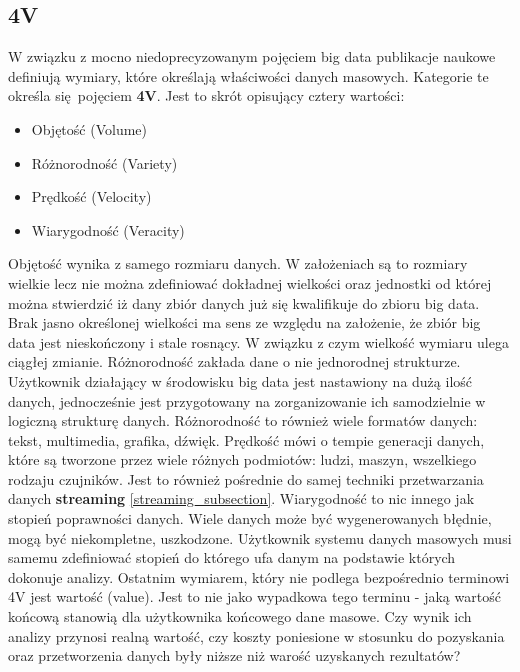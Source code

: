 \subsection{4V}
W związku z mocno niedoprecyzowanym pojęciem big data publikacje naukowe definiują wymiary, które określają właściwości danych masowych.\cite{big_data_great_services} Kategorie te określa się pojęciem \textbf{4V}. Jest to skrót opisujący cztery wartości:
\begin{itemize}
	\item Objętość (Volume)
	\item Różnorodność (Variety)
	\item Prędkość (Velocity)
	\item Wiarygodność (Veracity)
\end{itemize}
Objętość wynika z samego rozmiaru danych. W założeniach są to rozmiary wielkie lecz nie można zdefiniować dokładnej wielkości oraz jednostki od której można stwierdzić iż dany zbiór danych już się kwalifikuje do zbioru big data. Brak jasno określonej wielkości ma sens ze względu na założenie, że zbiór big data jest nieskończony i stale rosnący. W związku z czym wielkość wymiaru ulega ciągłej zmianie.\newline
Różnorodność zakłada dane o nie jednorodnej strukturze. Użytkownik działający w środowisku big data jest nastawiony na dużą ilość danych, jednocześnie jest przygotowany na zorganizowanie ich samodzielnie w logiczną strukturę danych. Różnorodność to również wiele formatów danych: tekst, multimedia, grafika, dźwięk.\newline
Prędkość mówi o tempie generacji danych, które są tworzone przez wiele różnych podmiotów: ludzi, maszyn, wszelkiego rodzaju czujników. Jest to również pośrednie do samej techniki przetwarzania danych \textbf{streaming} \ref{streaming_subsection}.\newline
Wiarygodność to nic innego jak stopień poprawności danych. Wiele danych może być wygenerowanych błędnie, mogą być niekompletne, uszkodzone. Użytkownik systemu danych masowych musi samemu zdefiniować stopień do którego ufa danym na podstawie których dokonuje analizy.\newline
Ostatnim wymiarem, który nie podlega bezpośrednio terminowi 4V jest wartość (value). Jest to nie jako wypadkowa tego terminu - jaką wartość końcową stanowią dla użytkownika końcowego dane masowe. Czy wynik ich analizy przynosi realną wartość, czy koszty poniesione w stosunku do pozyskania oraz przetworzenia danych były niższe niż warość uzyskanych rezultatów?
